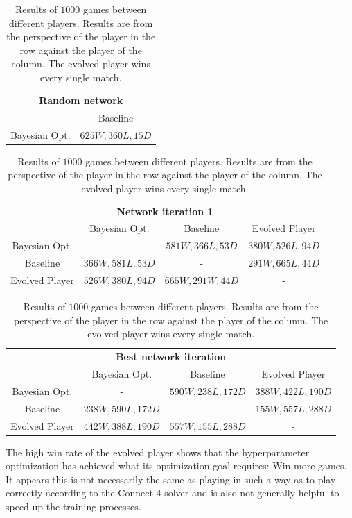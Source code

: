 \documentclass[12pt,onecolumn,oneside,titlepage]{article}
\begin{document}
\begin{table} [H]
 \centering

  \begin{tabular}{ c c }
  \multicolumn{2}{c}{\textbf{Random network}} \\
	       & Baseline  \\
  \hline
  Bayesian Opt. & $625W, 360L, 15D$
  \end{tabular}
 
  \begin{tabular}{ c c c c }
  \\
  \multicolumn{4}{c}{\textbf{Network iteration 1}} \\
	       & Bayesian Opt. & Baseline & Evolved Player  \\
  \hline
  Bayesian Opt. & - & $581W, 366L, 53D$ & $380W, 526L, 94D$ \\
  Baseline &  $366W, 581L, 53D$ & - & $291W, 665L, 44D$ \\
  Evolved Player & $526W, 380L, 94D$ & $665W, 291W, 44D$ & - \\
  \end{tabular}
  
  \begin{tabular}{ c c c c }
  \\
  \multicolumn{4}{c}{\textbf{Best network iteration}} \\
	       & Bayesian Opt. & Baseline & Evolved Player  \\
  \hline
  Bayesian Opt. & - & $590W, 238L, 172D$  & $388W, 422L, 190D$ \\
  Baseline & $238W, 590L, 172D$ & - & $155W, 557L, 288D$  \\
  Evolved Player & $442W, 388L, 190D$ & $557W, 155L, 288D$ & - \\
  \end{tabular}
  
  \caption{Results of $1000$ games between different players. Results are from the perspective of the player in the row against the player of the column. The evolved player wins every single match.}
  \label{t:hyperparam_games}
\end{table}

The high win rate of the evolved player shows that the hyperparameter optimization has achieved what its optimization goal requires: Win more games.
It appears this is not necessarily the same as playing in such a way as to play correctly according to the Connect 4 solver
and is also not generally helpful to speed up the training processes.
\end{document}
